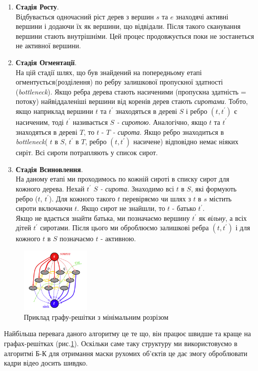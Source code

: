 \begin{enumerate}
    \item \textbf{Стадія Росту}. \\
        Відбувається одночасний ріст дерев з вершин $s$ та $e$ знаходячі активні
        вершини і додаючи їх як вершини, що відвідали. Після такого сканування вершини 
        стають внутрішніми. Цей процес продовжується поки не зостанеться не активної вершини.
    \item \textbf{Стадія Огментації}. \\
        На цій стадії шлях, що був знайдений на попередньому етапі огментується(розділення)
        по ребру залишкової пропускної здатності (\textit{bottleneck}). Якщо ребра дерева стають 
        насиченими (пропускна здатність = потоку) найвіддаленіші вершини від коренів дерев стають
        \textit{сиротами}. Тобто, якщо наприклад вершини $t$ та $t^{'}$ знаходяться в дереві $S$
        і ребро $(t,t^{'})$ є насиченим, тоді $t^{'}$ називається \textit{$S$ - сиротою}.
        Аналогічно, якщо $t$ та $t^{'}$ знаходяться в дереві $T$, то  $t$ - \textit{$T$ - сирота}.
        Якщо ребро знаходиться в \textit{bottleneck}( $t$ в $S$, $t^{'}$ в $T$, ребро $(t,t^{'})$ 
        насичене) відповідно немає ніяких сиріт. Всі сироти потрапляють у список сирот. 
    \item \textbf{Стадія Всиновлення}. \\
        На даному етапі ми проходимось по кожній сироті в списку сирот для кожного дерева.
        Нехай $t^{'}$ \textit{$S$ - сирота}. Знаходимо всі $t$  в $S$, які формують ребро 
        ($t$, $t^{'}$). Для кожного такого $t$ перевіряємо чи шлях з $t$ в $s$ містить сироти
        включаючи $t$. Якщо сирот не знайшли, то $t$ - батько  $t^{'}$. \\
        Якщо не вдається знайти батька, ми позначаємо вершину $t^{'}$ як \textit{вільну}, а всіх
        дітей $t^{'}$ сиротами. Після цього ми оброблюємо залишкові ребра $(t,t^{'})$ і для кожного $t$ в $S$ позначаємо
        $t$ - активною. 
\end{enumerate}


\begin{figure}[h]
    \centering
    \includegraphics[width=0.3\textwidth]{images/graph_cut}
    \caption{Приклад графу-решітки з мінімальним розрізом
    \label{fig:graph_lattice}
    }
\end{figure}

Найбільша перевага даного алгоритму це те що, він працює швидше та краще на графах-решітках 
(рис.\ref{fig:graph_lattice}).
Оскільки саме таку структуру ми використовуємо в алгоритмі Б-К для отримання маски рухомих 
об'єктів це дає змогу оброблювати кадри відео досить шивдко.
